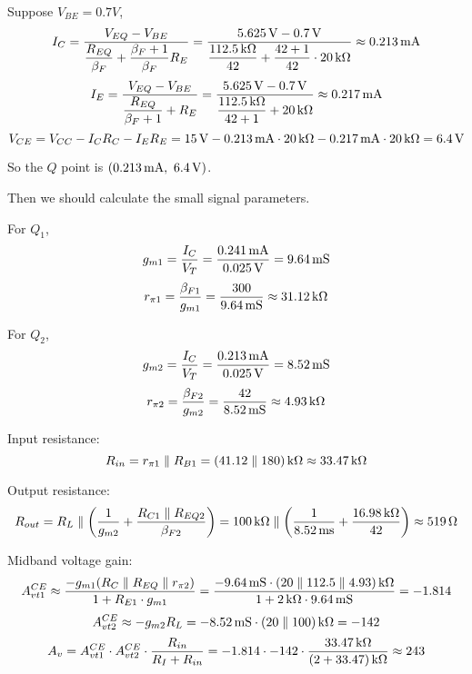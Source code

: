 \documentclass{article}
\newcommand{\unit}[1]{{\rm\,#1}}
\begin{document}
\begin{enumerate}[(1)]
Suppose $V_{BE}=0.7V$,
$$I_C=\frac{V_{EQ}-V_{BE}}{\dfrac{R_{EQ}}{\beta_F}+\dfrac{\beta_F+1}{\beta_F}R_E}=\frac{5.625\unit{V}-0.7\unit{V}}{\dfrac{112.5\unit{k\Omega}}{42}+\dfrac{42+1}{42}\cdot20\unit{k\Omega}}\approx0.213\unit{mA}$$
$$I_E=\frac{V_{EQ}-V_{BE}}{\dfrac{R_{EQ}}{\beta_F+1}+R_E}=\frac{5.625\unit{V}-0.7\unit{V}}{\dfrac{112.5\unit{k\Omega}}{42+1}+20\unit{k\Omega}}\approx0.217\unit{mA}$$
$$V_{CE}=V_{CC}-I_CR_C-I_ER_E=15\unit{V}-0.213\unit{mA}\cdot20\unit{k\Omega}-0.217\unit{mA}\cdot20\unit{k\Omega}=6.4\unit{V}$$

So the $Q$ point is $(0.213\unit{mA},\ 6.4\unit{V})$.

\end{enumerate}

Then we should calculate the small signal parameters.

For $Q_1$, $$g_{m1}=\frac{I_C}{V_T}=\frac{0.241\unit{mA}}{0.025\unit{V}}=9.64\unit{mS}$$
$$r_{\pi1}=\frac{\beta_{F1}}{g_{m1}}=\frac{300}{9.64\unit{mS}}\approx31.12\unit{k\Omega}$$

For $Q_2$, $$g_{m2}=\frac{I_C}{V_T}=\frac{0.213\unit{mA}}{0.025\unit{V}}=8.52\unit{mS}$$
$$r_{\pi2}=\frac{\beta_{F2}}{g_{m2}}=\frac{42}{8.52\unit{mS}}\approx4.93\unit{k\Omega}$$

Input resistance:
$$R_{in}=r_{\pi1}\parallel R_{B1}=(41.12\parallel180)\unit{k\Omega}\approx33.47\unit{k\Omega}$$

Output resistance:
$$R_{out}=R_L\parallel\left(\frac{1}{g_{m2}}+\frac{R_{C1}\parallel R_{EQ2}}{\beta_{F2}}\right)=100\unit{k\Omega}\parallel\left(\frac{1}{8.52\unit{ms}}+\frac{16.98\unit{k\Omega}}{42}\right)\approx519\unit{\Omega}$$

Midband voltage gain:
$$A_{vt1}^{CE}\approx\frac{-g_{m1}(R_C\parallel R_{EQ}\parallel r_{\pi2})}{1+R_{E1}\cdot g_{m1}}=\frac{-9.64\unit{mS}\cdot(20\parallel112.5\parallel4.93)\unit{k\Omega}}{1+2\unit{k\Omega}\cdot9.64\unit{mS}}=-1.814$$
$$A_{vt2}^{CE}\approx-g_{m2}R_L=-8.52\unit{mS}\cdot(20\parallel100)\unit{k\Omega}=-142$$
$$A_v=A_{vt1}^{CE}\cdot A_{vt2}^{CE}\cdot\frac{R_{in}}{R_I+R_{in}}=-1.814\cdot-142\cdot\frac{33.47\unit{k\Omega}}{(2+33.47)\unit{k\Omega}}\approx243$$
\end{document}

